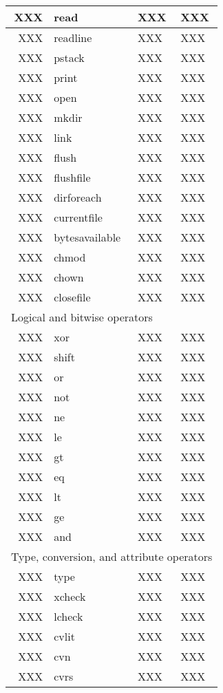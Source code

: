 \begin{longtable}{|r|l|l|p{4in}|}
\hline
XXX & read & XXX & XXX \\
\hline
XXX & readline & XXX & XXX \\
\hline
XXX & pstack & XXX & XXX \\
\hline
XXX & print & XXX & XXX \\
\hline
XXX & open & XXX & XXX \\
\hline
XXX & mkdir & XXX & XXX \\
\hline
XXX & link & XXX & XXX \\
\hline
XXX & flush & XXX & XXX \\
\hline
XXX & flushfile & XXX & XXX \\
\hline
XXX & dirforeach & XXX & XXX \\
\hline
XXX & currentfile & XXX & XXX \\
\hline
XXX & bytesavailable & XXX & XXX \\
\hline
XXX & chmod & XXX & XXX \\
\hline
XXX & chown & XXX & XXX \\
\hline
XXX & closefile & XXX & XXX \\
\hline \hline
\multicolumn{4}{|l|}{Logical and bitwise operators} \\
\hline \hline
XXX & xor & XXX & XXX \\
\hline
XXX & shift & XXX & XXX \\
\hline
XXX & or & XXX & XXX \\
\hline
XXX & not & XXX & XXX \\
\hline
XXX & ne & XXX & XXX \\
\hline
XXX & le & XXX & XXX \\
\hline
XXX & gt & XXX & XXX \\
\hline
XXX & eq & XXX & XXX \\
\hline
XXX & lt & XXX & XXX \\
\hline
XXX & ge & XXX & XXX \\
\hline
XXX & and & XXX & XXX \\
\hline \hline
\multicolumn{4}{|l|}{Type, conversion, and attribute operators} \\
\hline \hline
XXX & type & XXX & XXX \\
\hline
XXX & xcheck & XXX & XXX \\
\hline
XXX & lcheck & XXX & XXX \\
\hline
XXX & cvlit & XXX & XXX \\
\hline
XXX & cvn & XXX & XXX \\
\hline
XXX & cvrs & XXX & XXX \\

\end{longtable}
